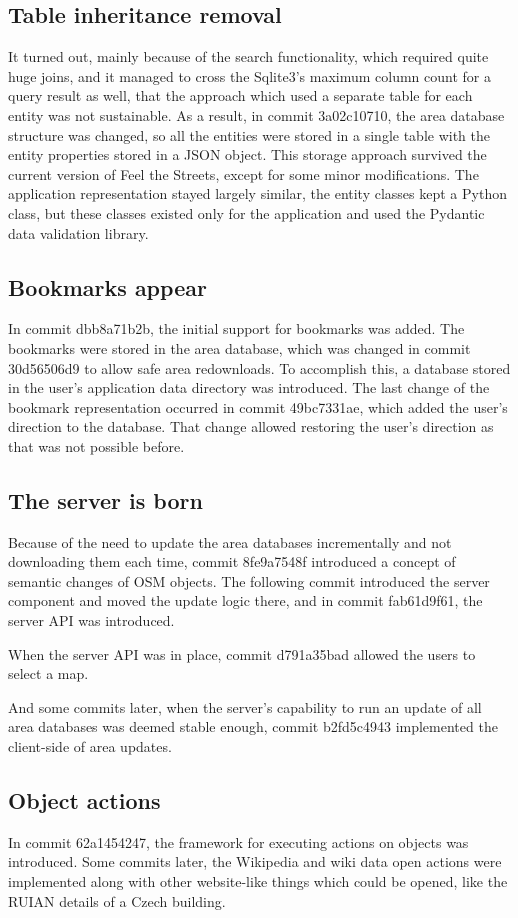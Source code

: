 \documentclass[nolof,digital]{fithesis3}
\begin{document}
\subsection{Table inheritance removal}
It turned out, mainly because of the search functionality, which required quite huge joins, and it managed to cross the Sqlite3's maximum column count for a query result as well, that the approach which used a separate table for each entity was not sustainable. As a result, in commit 3a02c10710, the area database structure was changed, so all the entities were stored in a single table with the entity properties stored in a JSON object. This storage approach survived the current version of Feel the Streets, except for some minor modifications. The application representation stayed largely similar, the entity classes kept a Python class, but these classes existed only for the application and used the Pydantic data validation library.
\subsection{Bookmarks appear}
In commit dbb8a71b2b, the initial support for bookmarks was added. The bookmarks were stored in the area database, which was changed in commit 30d56506d9 to allow safe area redownloads. To accomplish this, a database stored in the user's application data directory was introduced. The last change of the bookmark representation occurred in commit 49bc7331ae, which added the user's direction to the database. That change allowed restoring the user's direction as that was not possible before.
\subsection{The server is born}
Because of the need to update the area databases incrementally and not downloading them each time, commit 8fe9a7548f introduced a concept of semantic changes of OSM objects. The following commit introduced the server component and moved the update logic there, and in commit fab61d9f61, the server API was introduced.

When the server API was in place, commit d791a35bad allowed the users to select a map. 

And some commits later, when the server's capability to run an update of all area databases was deemed stable enough, commit b2fd5c4943 implemented the client-side of area updates.
\subsection{Object actions}
In commit 62a1454247, the framework for executing actions on objects was introduced. Some commits later, the Wikipedia and wiki data open actions were implemented along with other website-like things which could be opened, like the RUIAN details of a Czech building.
\end{document}
